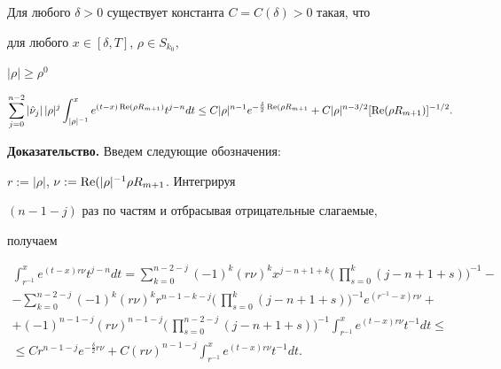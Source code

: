 \begin{lem}


Для любого $\delta>0$ существует константа $C=C(\delta)>0$ такая, что


для любого $x\in[\delta,T]$, $\rho\in S_{k_0}$,


$|\rho|\ge\rho^0$


$$


\sum^{n-2}_{j=0}|\Hat\nu_j|\,|\rho|^j


\int^x_{|\rho|^{-1}}e^{(t-x)\re(\rho R_{m+1})}


t^{j-n}dt\le C|\rho|^{n-1}


e^{-\frac{\delta}{2}\re(\rho R_{m+1}}+


C|\rho|^{n-3/2}[\re(\rho R_{m+1})]^{-1/2}.


$$


\end{lem}





{\bf Доказательство.} Введем следующие обозначения:


$r:=|\rho|$, $\nu:=\operatorname{Re}(|\rho|^{-1}\rho R_{m+1}$. Интегрируя


$(n-1-j)$ раз по частям и отбрасывая отрицательные слагаемые,


получаем


\begin{multline*}


\int^x_{r^{-1}}e^{(t-x)r\nu}t^{j-n}dt=\sum^{n-2-j}_{k=0}


(-1)^k(r\nu)^k x^{j-n+1+k}\biggl( \,\prod^k_{s=0}


(j-n+1+s)\biggr)^{-1}- \\


-\sum^{n-2-j}_{k=0}(-1)^k(r\nu)^kr^{n-1-k-j}\biggl(\,


\prod^k_{s=0}(j-n+1+s)\biggr)^{-1}e^{(r^{-1}-x)r\nu}+ \\


%


+(-1)^{n-1-j}(r\nu)^{n-1-j}\biggl(\,\prod^{n-2-j}_{s=0}(j-n+1+s)


\biggr)^{-1}\int^x_{r^{-1}}e^{(t-x)r\nu}t^{-1}dt\le \\


%


\le Cr^{n-1-j}e^{-\frac{\delta}{2}r\nu}+C(r\nu)^{n-1-j}


\int^x_{r^{-1}}e^{(t-x)r\nu}t^{-1}dt.


\end{multline*}





